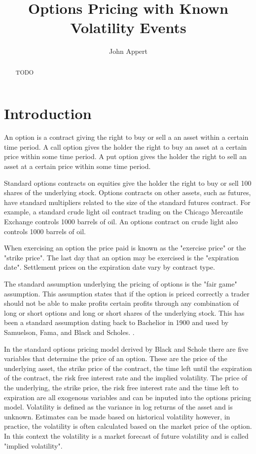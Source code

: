 \documentclass{article}
\begin{document}
\begin{titlepage} 
\title{Options Pricing with Known Volatility Events}
\author{John Appert}
\maketitle

\begin{abstract}
TODO
\end{abstract}

\end{titlepage}

\section{Introduction}

An option is a contract giving the right to buy or sell a an asset within a certain time period.  A call option gives the holder the right to buy an asset at a certain price within some time period.  A put option gives the holder the right to sell an asset at a certain price within some time period.  

Standard options contracts on equities give the holder the right to buy or sell 100 shares of the underlying stock.  Options contracts on other assets, such as futures, have standard multipliers related to the size of the standard futures contract.  For example, a standard crude light oil contract trading on the Chicago Mercantile Exchange controls 1000 barrels of oil.  An options contract on crude light also controls 1000 barrels of oil.

When exercising an option the price paid is known as the "exercise price" or the "strike price".  The last day that an option may be exercised is the "expiration date".  Settlement prices on the expiration date vary by contract type.  

The standard assumption underlying the pricing of options is the "fair game" assumption.  This assumption states that if the option is priced correctly a trader should not be able to make profits certain profits through any combination of long or short options and long or short shares of the underlying stock.  This has been a standard assumption dating back to Bachelior in 1900 and used by Samuelson, Fama, and Black and Scholes.  \cite{blackscholes73}\cite{samuelson65}\cite{fama65}.

In the standard options pricing model derived by Black and Schole there are five variables that determine the price of an option.  These are the price of the underlying asset, the strike price of the contract, the time left until the expiration of the contract, the risk free interest rate and the implied volatility.  The price of the underlying, the strike price, the risk free interest rate and the time left to expiration are all exogenous variables and can be inputed into the options pricing model.  Volatility is defined as the variance in log returns of the asset and is unknown.  Estimates can be made based on historical volatility however, in practice, the volatility is often calculated based on the market price of the option.  In this context the volatility is a market forecast of future volatility and is called "implied volatility".  
\end{document}
